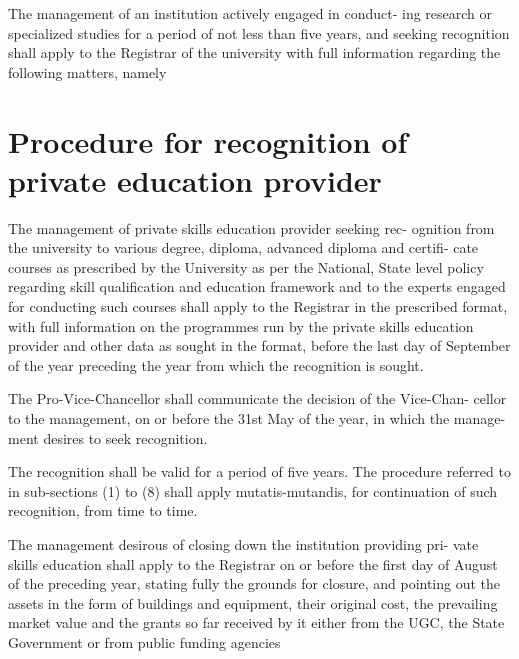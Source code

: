 \documentclass[gaz5a]{mhact}
\begin{document}
      \begin{subsectionlist}
    

The management of an institution actively engaged in conduct- ing research or specialized studies for a period of not less than five years, and seeking recognition shall apply to the Registrar of the university with full information regarding the following matters, namely

      
       \end{subsectionlist}
    
      \section{Procedure for recognition of private education provider}
      

      \begin{subsectionlist}
    

The management of private skills education provider seeking rec- ognition from the university to various degree, diploma, advanced diploma and certifi- cate courses as prescribed by the University as per the National, State level policy regarding skill qualification and education framework and to the experts engaged for conducting such courses shall apply to the Registrar in the prescribed format, with full information on the programmes run by the private skills education provider and other data as sought in the format, before the last day of September of the year preceding the year from which the recognition is sought.
      

The Pro-Vice-Chancellor shall communicate the decision of the Vice-Chan- cellor to the management, on or before the 31st May of the year, in which the manage- ment desires to seek recognition.
      

The recognition shall be valid for a period of five years. The procedure referred to in sub-sections (1) to (8) shall apply mutatis-mutandis, for continuation of such recognition, from time to time.
      

The management desirous of closing down the institution providing pri- vate skills education shall apply to the Registrar on or before the first day of August of the preceding year, stating fully the grounds for closure, and pointing out the assets in the form of buildings and equipment, their original cost, the prevailing market value and the grants so far received by it either from the UGC, the State Government or from public funding agencies

      
       \end{subsectionlist}
    
\end{document}
